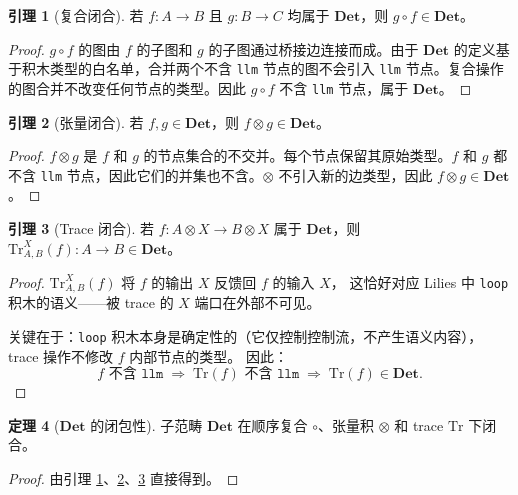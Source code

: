 \documentclass[11pt,a4paper]{article}
\theoremstyle{definition}
\newtheorem{theorem}{定理}[section]
\newtheorem{lemma}[theorem]{引理}
\theoremstyle{definition}
\theoremstyle{remark}
\newcommand{\cat}[1]{\mathbf{#1}}
\newcommand{\catDet}{\cat{Det}}
\newcommand{\tensor}{\otimes}
\begin{document}
\begin{lemma}[复合闭合]\label{lem:det-comp}
若 $f: A \to B$ 且 $g: B \to C$ 均属于 $\catDet$，则 $g \circ f \in \catDet$。
\end{lemma}

\begin{proof}
$g \circ f$ 的图由 $f$ 的子图和 $g$ 的子图通过桥接边连接而成。由于 $\catDet$ 的定义基于积木类型的白名单，合并两个不含 \texttt{llm} 节点的图不会引入 \texttt{llm} 节点。复合操作的图合并不改变任何节点的类型。因此 $g \circ f$ 不含 \texttt{llm} 节点，属于 $\catDet$。
\end{proof}

\begin{lemma}[张量闭合]\label{lem:det-tensor}
若 $f, g \in \catDet$，则 $f \tensor g \in \catDet$。
\end{lemma}

\begin{proof}
$f \tensor g$ 是 $f$ 和 $g$ 的节点集合的不交并。每个节点保留其原始类型。$f$ 和 $g$ 都不含 \texttt{llm} 节点，因此它们的并集也不含。$\tensor$ 不引入新的边类型，因此 $f \tensor g \in \catDet$。
\end{proof}

\begin{lemma}[Trace 闭合]\label{lem:det-trace}
若 $f: A \tensor X \to B \tensor X$ 属于 $\catDet$，则 $\mathrm{Tr}^{X}_{A,B}(f): A \to B \in \catDet$。
\end{lemma}

\begin{proof}
$\mathrm{Tr}^{X}_{A,B}(f)$ 将 $f$ 的输出 $X$ 反馈回 $f$ 的输入 $X$，
这恰好对应 Lilies 中 \texttt{loop} 积木的语义——被 trace 的 $X$ 端口在外部不可见。

关键在于：\texttt{loop} 积木本身是确定性的（它仅控制控制流，不产生语义内容），
trace 操作不修改 $f$ 内部节点的类型。
因此：
\[
f \text{ 不含 } \texttt{llm} \;\Rightarrow\; \mathrm{Tr}(f) \text{ 不含 } \texttt{llm} \;\Rightarrow\; \mathrm{Tr}(f) \in \catDet.
\]
\end{proof}

\begin{theorem}[$\catDet$ 的闭包性]\label{thm:det-closure}
子范畴 $\catDet$ 在顺序复合 $\circ$、张量积 $\tensor$ 和 trace $\mathrm{Tr}$ 下闭合。
\end{theorem}

\begin{proof}
由引理 \ref{lem:det-comp}、\ref{lem:det-tensor}、\ref{lem:det-trace} 直接得到。
\end{proof}
\end{document}

